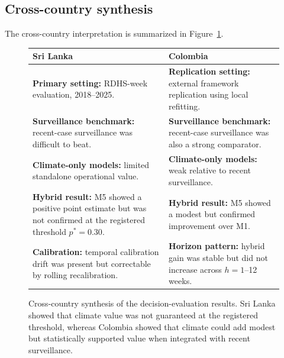 \documentclass[11pt,a4paper]{article}
\begin{document}
\subsection{Cross-country synthesis}
The cross-country interpretation is summarized in Figure~\ref{fig:cross-country-synthesis}.
\begin{figure}[!htbp]
\centering
\scriptsize
\renewcommand{\arraystretch}{1.08}
\begin{tabular}{p{}p{}}
\toprule
\textbf{Sri Lanka} & \textbf{Colombia} \\
\midrule

\textbf{Primary setting:} RDHS-week evaluation, 2018--2025.
&
\textbf{Replication setting:} external framework replication using local refitting.
\\[0.08cm]

\textbf{Surveillance benchmark:} recent-case surveillance was difficult to beat.
&
\textbf{Surveillance benchmark:} recent-case surveillance was also a strong comparator.
\\[0.08cm]

\textbf{Climate-only models:} limited standalone operational value.
&
\textbf{Climate-only models:} weak relative to recent surveillance.
\\[0.08cm]

\textbf{Hybrid result:} M5 showed a positive point estimate but was not confirmed at the registered threshold $p^*=0.30$.
&
\textbf{Hybrid result:} M5 showed a modest but confirmed improvement over M1.
\\[0.08cm]

\textbf{Calibration:} temporal calibration drift was present but correctable by rolling recalibration.
&
\textbf{Horizon pattern:} hybrid gain was stable but did not increase across $h=1$--12 weeks.
\\

\bottomrule
\end{tabular}

\vspace{0.25cm}


\caption{
Cross-country synthesis of the decision-evaluation results. Sri Lanka showed that climate value was not guaranteed at the registered threshold, whereas Colombia showed that climate could add modest but statistically supported value when integrated with recent surveillance.
}
\label{fig:cross-country-synthesis}
\end{figure}
\end{document}
